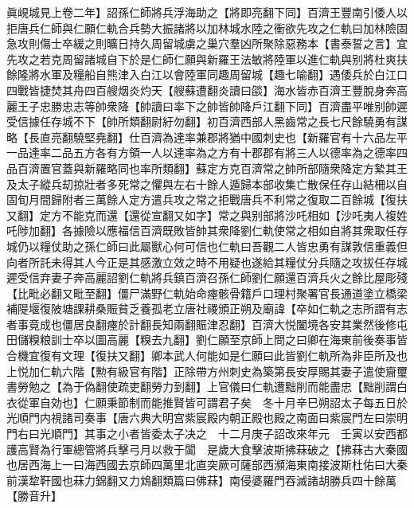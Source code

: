 眞峴城見上卷二年】詔孫仁師將兵浮海助之【將即亮翻下同】百濟王豐南引倭人以拒唐兵仁師與仁願仁軌合兵勢大振諸將以加林城水陸之衝欲先攻之仁軌曰加林險固急攻則傷士卒緩之則曠日持久周留城虜之巢穴羣凶所聚除惡務本【書泰誓之言】宜先攻之若克周留諸城自下於是仁師仁願與新羅王法敏將陸軍以進仁軌與别將杜爽扶餘隆將水軍及糧船自熊津入白江以會陸軍同趣周留城【趣七喻翻】遇倭兵於白江口四戰皆捷焚其舟四百艘烟炎灼天【艘蘇遭翻炎讀曰燄】海水皆赤百濟王豐脫身奔高麗王子忠勝忠志等帥衆降【帥讀曰率下之帥皆帥降戶江翻下同】百濟盡平唯别帥遲受信據任存城不下【帥所類翻尉紆勿翻】初百濟西部人黑齒常之長七尺餘驍勇有謀略【長直亮翻驍堅堯翻】仕百濟為達率兼郡將猶中國刺史也【新羅官有十六品左平一品達率二品五方各有方領一人以達率為之方有十郡郡有將三人以德率為之德率四品百濟置官蓋與新羅略同也率所類翻】蘇定方克百濟常之帥所部隨衆降定方縶其王及太子縱兵刧掠壯者多死常之懼與左右十餘人遁歸本部收集亡散保任存山結柵以自固旬月間歸附者三萬餘人定方遣兵攻之常之拒戰唐兵不利常之復取二百餘城【復扶又翻】定方不能克而還【還從宣翻又如字】常之與别部將沙吒相如【沙吒夷人複姓吒陟加翻】各據險以應福信百濟既敗皆帥其衆降劉仁軌使常之相如自將其衆取任存城仍以糧仗助之孫仁師曰此屬獸心何可信也仁軌曰吾觀二人皆忠勇有謀敦信重義但向者所託未得其人今正是其感激立效之時不用疑也遂給其糧仗分兵隨之攻拔任存城遲受信弃妻子奔高麗詔劉仁軌將兵鎮百濟召孫仁師劉仁願還百濟兵火之餘比屋彫殘【比毗必翻又毗至翻】僵尸滿野仁軌始命瘞骸骨籍戶口理村聚署官長通道塗立橋梁補隄堰復陂塘課耕桑賑貧乏養孤老立唐社禝頒正朔及廟諱【卒如仁軌之志所謂有志者事竟成也僵居良翻瘞於計翻長知兩翻賑津忍翻】百濟大悦闔境各安其業然後修屯田儲糗粮訓士卒以圖高麗【糗去九翻】劉仁願至京師上問之曰卿在海東前後奏事皆合機宜復有文理【復扶又翻】卿本武人何能如是仁願曰此皆劉仁軌所為非臣所及也上悦加仁軌六階【勲有級官有階】正除帶方州刺史為築第長安厚賜其妻子遣使齎璽書勞勉之【為于偽翻使疏吏翻勞力到翻】上官儀曰仁軌遭黜削而能盡忠【黜削謂白衣從軍自効也】仁願秉節制而能推賢皆可謂君子矣　冬十月辛巳朔詔太子每五日於光順門内視諸司奏事【唐六典大明宫紫宸殿内朝正殿也殿之南面曰紫宸門左曰崇明門右曰光順門】其事之小者皆委太子决之　十二月庚子詔改來年元　壬寅以安西都護高賢為行軍總管將兵擊弓月以救于闐　是歲大食擊波斯拂菻破之【拂菻古大秦國也居西海上一曰海西國去京師四萬里北直突厥可薩部西瀕海東南接波斯杜佑曰大秦前漢犂靬國也菻力錦翻又力鴆翻類篇曰佛菻】南侵婆羅門吞滅諸胡勝兵四十餘萬【勝音升】

